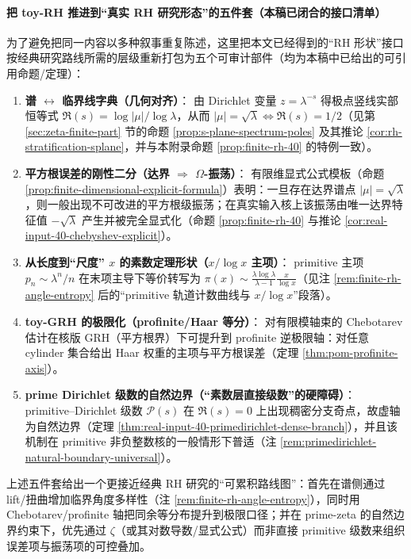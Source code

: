 \paragraph{把 toy-RH 推进到“真实 RH 研究形态”的五件套（本稿已闭合的接口清单）}\label{par:finite-rh-rhstyle-toolkit}
为了避免把同一内容以多种叙事重复陈述，这里把本文已经得到的“RH 形状”接口按经典研究路线所需的层级重新打包为五个可审计部件（均为本稿中已给出的可引用命题/定理）：
\begin{enumerate}
  \item \textbf{谱 \(\leftrightarrow\) 临界线字典（几何对齐）}：
  由 Dirichlet 变量 \(z=\lambda^{-s}\) 得极点竖线实部恒等式 \(\Re(s)=\log|\mu|/\log\lambda\)，从而 \(|\mu|=\sqrt{\lambda}\iff \Re(s)=1/2\)（见第 \ref{sec:zeta-finite-part} 节的命题 \ref{prop:s-plane-spectrum-poles} 及其推论 \ref{cor:rh-stratification-splane}，并与本附录命题 \ref{prop:finite-rh-40} 的特例一致）。
  \item \textbf{平方根误差的刚性二分（达界 \(\Rightarrow\) \(\Omega\)-振荡）}：
  有限维显式公式模板（命题 \ref{prop:finite-dimensional-explicit-formula}）表明：一旦存在达界谱点 \(|\mu|=\sqrt{\lambda}\)，则一般出现不可改进的平方根级振荡；在真实输入核上该振荡由唯一达界特征值 \(-\sqrt{\lambda}\) 产生并被完全显式化（命题 \ref{prop:finite-rh-40} 与推论 \ref{cor:real-input-40-chebyshev-explicit}）。
  \item \textbf{从长度到“尺度” \(x\) 的素数定理形状（\(x/\log x\) 主项）}：
primitive 主项 \(p_n\sim \lambda^n/n\) 在末项主导下等价转写为 \(\pi(x)\sim \frac{\lambda\log\lambda}{\lambda-1}\frac{x}{\log x}\)（见注 \ref{rem:finite-rh-angle-entropy} 后的“primitive 轨道计数曲线与 \(x/\log x\)”段落）。
  \item \textbf{toy-GRH 的极限化（profinite/Haar 等分）}：
  对有限模轴束的 Chebotarev 估计在核版 GRH（平方根界）下可提升到 profinite 逆极限轴：对任意 cylinder 集合给出 Haar 权重的主项与平方根误差（定理 \ref{thm:pom-profinite-axis}）。
  \item \textbf{prime Dirichlet 级数的自然边界（“素数层直接级数”的硬障碍）}：
  primitive--Dirichlet 级数 \(\mathcal{P}(s)\) 在 \(\Re(s)=0\) 上出现稠密分支奇点，故虚轴为自然边界（定理 \ref{thm:real-input-40-primedirichlet-dense-branch}），并且该机制在 primitive 非负整数核的一般情形下普适（注 \ref{rem:primedirichlet-natural-boundary-universal}）。
\end{enumerate}
上述五件套给出一个更接近经典 RH 研究的“可累积路线图”：首先在谱侧通过 lift/扭曲增加临界角度多样性（注 \ref{rem:finite-rh-angle-entropy}），同时用 Chebotarev/profinite 轴把同余等分布提升到极限口径；并在 prime-zeta 的自然边界约束下，优先通过 \(\zeta\)（或其对数导数/显式公式）而非直接 primitive 级数来组织误差项与振荡项的可控叠加。

